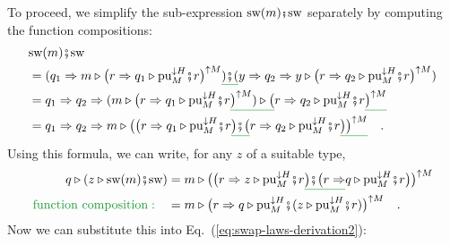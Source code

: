 To proceed, we simplify the sub-expression $\text{sw}(m)\bef\text{sw}$
separately by computing the function compositions:
\begin{align*}
 & \text{sw}(m)\bef\text{sw}\\
 & =(q_{1}\Rightarrow m\triangleright\big(r\Rightarrow q_{1}\triangleright\text{pu}_{M}^{\downarrow H}\bef r\big)^{\uparrow M}\gunderline{)\bef(}y\Rightarrow q_{2}\Rightarrow y\triangleright\big(r\Rightarrow q_{2}\triangleright\text{pu}_{M}^{\downarrow H}\bef r\big)^{\uparrow M})\\
 & =q_{1}\Rightarrow q_{2}\Rightarrow(m\triangleright\big(r\Rightarrow q_{1}\triangleright\text{pu}_{M}^{\downarrow H}\bef r\gunderline{\big)^{\uparrow M})\triangleright\big(}r\Rightarrow q_{2}\triangleright\text{pu}_{M}^{\downarrow H}\bef r\gunderline{\big)^{\uparrow M}}\\
 & =q_{1}\Rightarrow q_{2}\Rightarrow m\triangleright\big(\big(r\Rightarrow q_{1}\triangleright\text{pu}_{M}^{\downarrow H}\bef r\gunderline{\big)\bef\big(}r\Rightarrow q_{2}\triangleright\text{pu}_{M}^{\downarrow H}\bef r\gunderline{\big)\big)^{\uparrow M}}\quad.
\end{align*}
Using this formula, we can write, for any $z$ of a suitable type,
\begin{align}
q\triangleright(z\triangleright\text{sw}(m)\bef\text{sw}) & =m\triangleright\big(\big(r\Rightarrow z\triangleright\text{pu}_{M}^{\downarrow H}\bef r\gunderline{\big)\bef\big(r\Rightarrow}q\triangleright\text{pu}_{M}^{\downarrow H}\bef r\big)\big)^{\uparrow M}\nonumber \\
{\color{greenunder}\text{function composition}:}\quad & =m\triangleright\big(r\Rightarrow q\triangleright\text{pu}_{M}^{\downarrow H}\bef(z\triangleright\text{pu}_{M}^{\downarrow H}\bef r)\big)^{\uparrow M}\quad.\label{eq:swap-law-3-derivation-1}
\end{align}
Now we can substitute this into Eq.~(\ref{eq:swap-laws-derivation2}):
